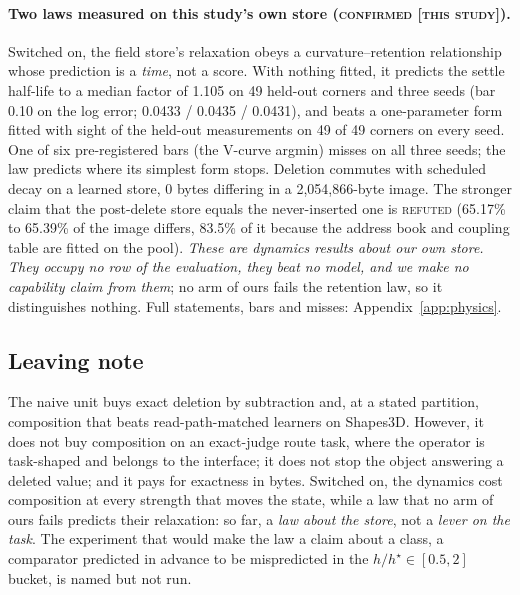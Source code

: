 \documentclass{article} %
\begin{document}
\paragraph{Two laws measured on this study's own store (\textsc{confirmed [this study]}).}
Switched on, the field store's relaxation obeys a curvature--retention relationship whose
prediction is a \emph{time}, not a score. With nothing fitted, it predicts the settle half-life to
a median factor of 1.105 on 49 held-out corners and three seeds (bar 0.10 on the log error; 0.0433
/ 0.0435 / 0.0431), and beats a one-parameter form fitted with sight of the held-out
measurements on 49 of 49 corners on every seed. One of six pre-registered bars (the V-curve
argmin) misses on all three seeds; the law predicts where its simplest form stops.
Deletion commutes with scheduled decay on a learned store, 0 bytes differing in a
2,054,866-byte image. The stronger claim that the post-delete store equals the never-inserted one is \textsc{refuted} (65.17\% to 65.39\% of the image differs, 83.5\% of it because the
address book and coupling table are fitted on the pool). %
\emph{These are dynamics results about our own store. They occupy no row of the evaluation, they
beat no model, and we make no capability claim from them}; no arm of ours fails the retention law, so it distinguishes nothing. Full statements, bars and misses: Appendix~\ref{app:physics}.

\subsection{Leaving note}
\label{sec:leaving}

The naive unit buys exact deletion by subtraction and, at a stated partition, composition that
beats read-path-matched learners on Shapes3D. However, it does not buy composition on an
exact-judge route task, where the operator is task-shaped and belongs to the interface; it does
not stop the object answering a deleted value; and it pays for exactness in bytes. Switched on, the dynamics cost composition at every strength that moves the state, while a law that no arm
of ours fails predicts their relaxation: so far, a \emph{law about the store}, not a \emph{lever on
the task}. The experiment that would make the law a claim about a class, a comparator
predicted in advance to be mispredicted in the $h/h^\star\in[0.5,2]$ bucket, is named but not run. %
\end{document}
